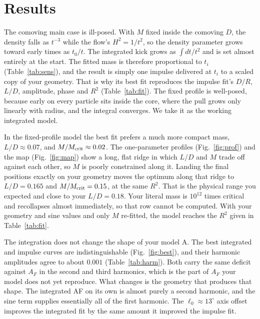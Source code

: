 \documentclass[10pt,letterpaper]{article}
\begin{document}
\section{Results}
The comoving main case is ill-posed. With $M$ fixed inside the comoving $D$, the density falls as $t^{-3}$ while the flow's $H^2=1/t^2$, so the density parameter grows toward early times as $t_0/t$. The integrated kick grows as $\int dt/t^2$ and is set almost entirely at the start. The fitted mass is therefore proportional to $t_i$ (Table~\ref{tab:sens}), and the result is simply one impulse delivered at $t_i$ to a scaled copy of your geometry. That is why its best fit reproduces the impulse fit's $D/R$, $L/D$, amplitude, phase and $R^2$ (Table~\ref{tab:fit}). The fixed profile is well-posed, because early on every particle sits inside the core, where the pull grows only linearly with radius, and the integral converges. We take it as the working integrated model.

In the fixed-profile model the best fit prefers a much more compact mass, $L/D\approx0.07$, and $M/M_{\rm crit}\approx0.02$. The one-parameter profiles (Fig.~\ref{fig:prof}) and the map (Fig.~\ref{fig:map}) show a long, flat ridge in which $L/D$ and $M$ trade off against each other, so $M$ is poorly constrained along it. Landing the final positions exactly on your geometry moves the optimum along that ridge to $L/D=0.165$ and $M/M_{\rm crit}=0.15$, at the same $R^2$. That is the physical range you expected and close to your $L/D=0.18$. Your literal mass is $10^{12}$ times critical and recollapses almost immediately, so that row cannot be computed. With your geometry and sine values and only $M$ re-fitted, the model reaches the $R^2$ given in Table~\ref{tab:fit}.

The integration does not change the shape of your model A. The best integrated and impulse curves are indistinguishable (Fig.~\ref{fig:best}), and their harmonic amplitudes agree to about $0.001$ (Table~\ref{tab:harm}). Both carry the same deficit against $A_F$ in the second and third harmonics, which is the part of $A_F$ your model does not yet reproduce. What changes is the geometry that produces that shape. The integrated AF on its own is almost purely a second harmonic, and the sine term supplies essentially all of the first harmonic. The $\ell_0\approx13^\circ$ axis offset improves the integrated fit by the same amount it improved the impulse fit.
\end{document}

